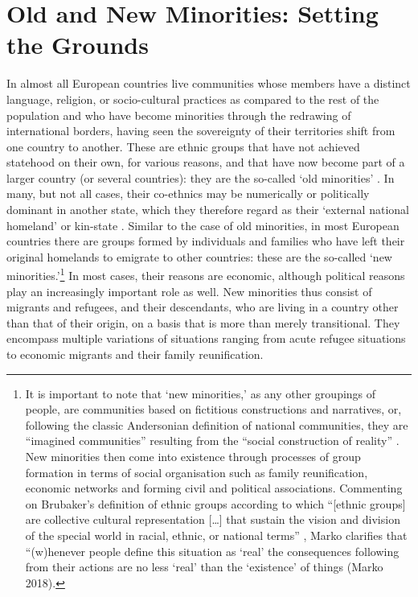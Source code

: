 \documentclass[output=paper,colorlinks,citecolor=brown]{langscibook}
\begin{document}
\section{Old and New Minorities: Setting the Grounds }\label{ch2.4.ss.2}

In almost all European countries live communities whose members have a distinct language, religion, or socio-cultural practices as compared to the rest of the population and who have become minorities through the redrawing of international borders, having seen the sovereignty of their territories shift from one country to another. These are ethnic groups that have not achieved statehood on their own, for various reasons, and that have now become part of a larger country (or several countries): they are the so-called `old minorities' \citep{brubaker2004,smith2010,keating2002,mabry_et_al2013,marko_constantin2019}. In many, but not all cases, their co-ethnics may be numerically or politically dominant in another state, which they therefore regard as their `external national homeland' or kin-state \citep{osce_hcnm2008}. Similar to the case of old minorities, in most European countries there are groups formed by individuals and families who have left their original homelands to emigrate to other countries: these are the so-called `new minorities.'\footnote{It is important to note that `new minorities,' as any other groupings of people, are communities based on fictitious constructions and narratives, or, following the classic Andersonian definition of national communities, they are  ``imagined communities'' resulting from the ``social construction of reality'' \citep{Anderson1983}. New minorities then come into existence through processes of group formation in terms of social organisation such as family reunification, economic networks and forming civil and political associations. Commenting on Brubaker's definition of ethnic groups according to which ``[ethnic groups] are collective cultural representation […] that sustain the vision and division of the special world in racial, ethnic, or national terms'' \citep{brubaker2004}, Marko clarifies that ``(w)henever people define this situation as `real' the consequences following from their actions are no less `real' than the `existence' of things (Marko 2018).} In most cases, their reasons are economic, although political reasons play an increasingly important role as well. New minorities thus consist of migrants and refugees, and their descendants, who are living in a country other than that of their origin, on a basis that is more than merely transitional. They encompass multiple variations of situations ranging from acute refugee situations to economic migrants and their family reunification.
\end{document}
